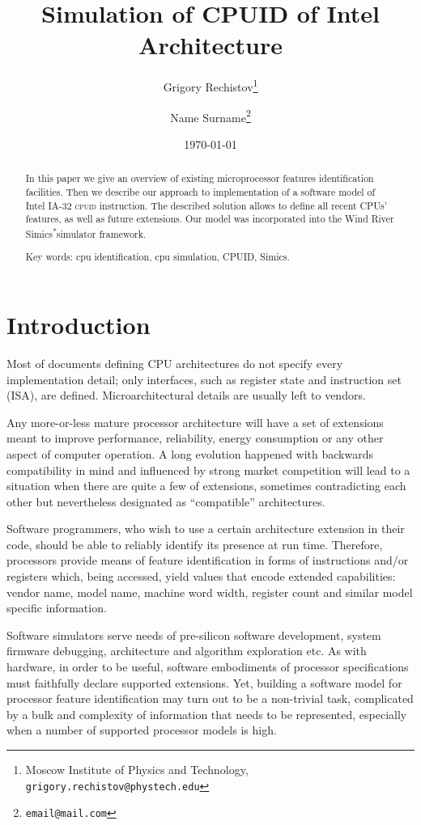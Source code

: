 \documentclass[a4paper,10pt,oneside,unicode]{article}
\author{Grigory Rechistov\thanks{Moscow Institute of Physics and Technology, \texttt{grigory.rechistov@phystech.edu}} \and Name Surname\thanks{\texttt{email@mail.com}}}
\title{Simulation of CPUID of Intel Architecture}
\date{\today}
\newcommand{\cpuid}{\textsc{cpuid} }
\newcommand{\othercopyright}{\textsuperscript{*}}
\begin{document}
\maketitle

\tableofcontents

\begin{abstract}
    
   \noindent In this paper we give an overview of existing microprocessor features identification facilities. Then we describe our approach to implementation of a software model of Intel IA-32 \cpuid instruction. The described solution allows to define all recent {CPUs}' features, as well as future extensions. Our model was incorporated into the Wind River Simics\othercopyright simulator framework.
    
    \noindent Key words: cpu identification, cpu simulation, CPUID, Simics.
\end{abstract}

\section {Introduction}

Most of documents defining CPU architectures do not specify every implementation detail; only interfaces, such as register state and instruction set (ISA), are defined. Microarchitectural details are usually left to vendors.

Any more-or-less mature processor architecture will have a set of extensions meant to improve performance, reliability, energy consumption or any other aspect of computer operation. A long evolution happened with backwards compatibility in mind and influenced by strong market competition will lead to a situation when there are quite a few of extensions, sometimes contradicting each other but nevertheless designated as “compatible” architectures.

Software programmers, who wish to use a certain architecture extension in their code, should be able to reliably identify its presence at run time. Therefore, processors provide means of feature identification in forms of instructions and/or registers which, being accessed, yield values that encode extended capabilities: vendor name, model name, machine word width, register count and similar model specific information.

Software simulators serve needs of pre-silicon software development, system firmware debugging, architecture and algorithm exploration etc. As with hardware, in order to be useful, software embodiments of processor specifications must faithfully declare supported extensions. Yet, building a software model for processor feature identification may turn out to be a non-trivial task, complicated by a bulk and complexity of information that needs to be represented, especially when a number of supported processor models is high. 
\end{document}
